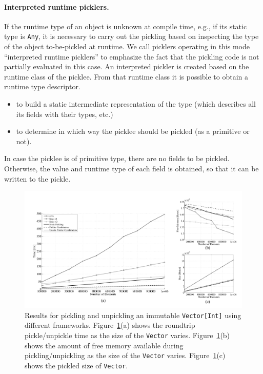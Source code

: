\documentclass[preprint,10pt]{sigplanconf}
\theoremstyle{definition}
\theoremstyle{definition}
\newcommand{\todo}{{\bf \colorbox{red}{\color{white}TODO:}}}
\newcommand{\term}[1]{\mbox{\texttt{#1}}}
\begin{document}
\paragraph{Interpreted runtime picklers.} If the runtime type of an object is
unknown at compile time, e.g., if its static type is \term{Any}, it is
necessary to carry out the pickling based on inspecting the type of the object
to-be-pickled at runtime. We call picklers operating in this mode ``interpreted
runtime picklers'' to emphasize the fact that the pickling code is not
partially evaluated in this case. An interpreted pickler is created based on
the runtime class of the picklee. From that runtime class it is possible to
obtain a runtime type descriptor.

\begin{itemize}
\item to build a static intermediate representation of the type (which describes all its fields with their types, etc.)
\item to determine in which way the picklee should be pickled (as a primitive or not).
\end{itemize}

In case the picklee is of primitive type, there are no fields to be pickled.
Otherwise, the value and runtime type of each field is obtained, so that it
can be written to the pickle.



\begin{figure}[ht!]
 \centering
 \includegraphics[width=\textwidth]{travInt-all.pdf}
 \caption{Results for pickling and unpickling an immutable
   \texttt{Vector[Int]} using different frameworks. Figure~\ref{fig:results-vector}(a) shows the roundtrip pickle/unpickle time as the size of the \texttt{Vector} varies. Figure~\ref{fig:results-vector}(b) shows the amount of free memory available during pickling/unpickling as the size of the \texttt{Vector} varies. Figure~\ref{fig:results-vector}(c) shows the pickled size of \texttt{Vector}.}
 \label{fig:results-vector}
\end{figure}
\end{document}
